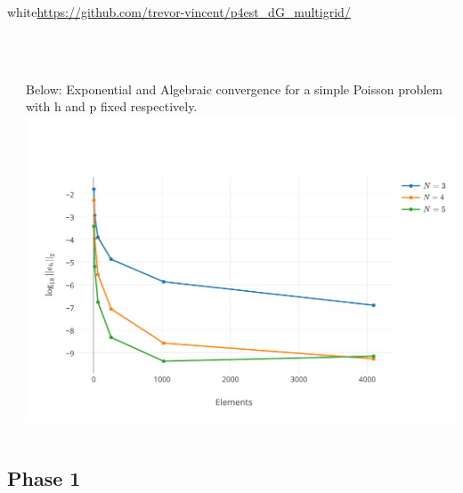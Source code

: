 {\begin{mybox}{white}{\centering \url{https://github.com/trevor-vincent/p4est_dG_multigrid/}}
\begin{columns}
\begin{column}{.48\textwidth}
  \end{column}
  \begin{column}{.48\textwidth}
{\tiny $\,\,\,$}\\
{\tiny $\,\,\,$}\\
{\tiny Below: Exponential and Algebraic convergence for a simple Poisson problem with h and p fixed respectively.}
\vspace{-.3cm}
\includegraphics[width=\textwidth]{pictures/Nfixed.pdf}        
  \end{column} 
\end{columns}


\end{mybox}






}

\subsection{Phase 1}

